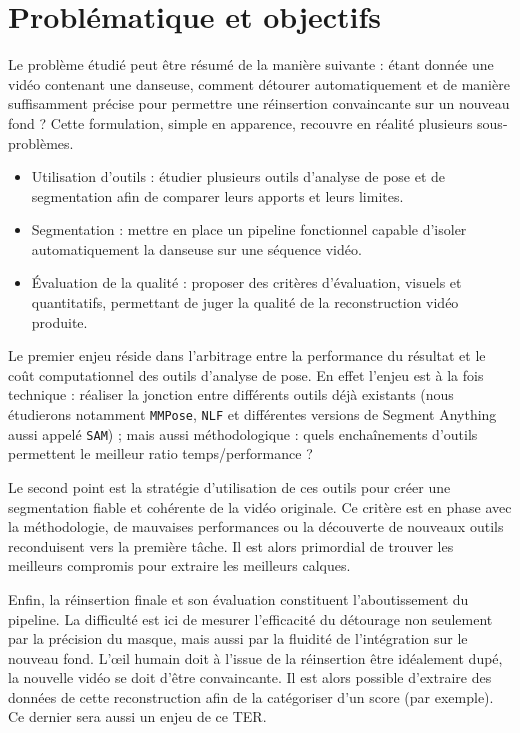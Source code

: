\documentclass[11pt,a4paper]{article}
\begin{document}
\newpage

\section{Problématique et objectifs}
Le problème étudié peut être résumé de la manière suivante : étant donnée une vidéo contenant une danseuse, comment détourer automatiquement et de manière suffisamment précise pour permettre une réinsertion convaincante sur un nouveau fond ?
Cette formulation, simple en apparence, recouvre en réalité plusieurs sous-problèmes.

\begin{itemize}
    \item Utilisation d'outils : étudier plusieurs outils d'analyse de pose et de segmentation afin de comparer leurs apports et leurs limites.
    \item Segmentation : mettre en place un pipeline fonctionnel capable d'isoler automatiquement la danseuse sur une séquence vidéo.
    \item Évaluation de la qualité : proposer des critères d'évaluation, visuels et quantitatifs, permettant de juger la qualité de la reconstruction vidéo produite.
\end{itemize}

Le premier enjeu réside dans l'arbitrage entre la performance du résultat et le coût computationnel des outils d'analyse de pose.
En effet l'enjeu est à la fois technique : réaliser la jonction entre différents outils déjà existants (nous étudierons notamment \texttt{MMPose}, \texttt{NLF} et différentes versions de Segment Anything aussi appelé \texttt{SAM}) ; mais aussi méthodologique : quels enchaînements d'outils permettent le meilleur ratio temps/performance ?

Le second point est la stratégie d'utilisation de ces outils pour créer une segmentation fiable et cohérente de la vidéo originale. Ce critère est en phase avec la méthodologie, de mauvaises performances ou la découverte de nouveaux outils reconduisent vers la première tâche.
Il est alors primordial de trouver les meilleurs compromis pour extraire les meilleurs calques.

Enfin, la réinsertion finale et son évaluation constituent l'aboutissement du pipeline. La difficulté est ici de mesurer l'efficacité du détourage non seulement par la précision du masque, mais aussi par la fluidité de l'intégration sur le nouveau fond.
L'œil humain doit à l'issue de la réinsertion être idéalement dupé, la nouvelle vidéo se doit d'être convaincante.
Il est alors possible d'extraire des données de cette reconstruction afin de la catégoriser d'un score (par exemple). Ce dernier sera aussi un enjeu de ce TER. 
\end{document}
